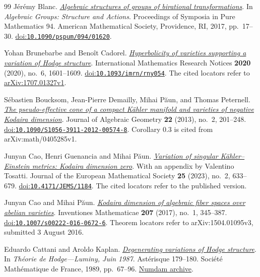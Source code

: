 \begin{thebibliography}{99}
J{\'e}r{\'e}my Blanc.
\emph{\href{https://algebra.dmi.unibas.ch/blanc/articles/structurebir.pdf}{Algebraic structures of groups of birational transformations}}.
In \emph{Algebraic Groups: Structure and Actions}.
Proceedings of Symposia in Pure Mathematics 94.
American Mathematical Society, Providence, RI, 2017, pp.~17--30.
\href{https://doi.org/10.1090/pspum/094/01620}{doi:\nolinkurl{10.1090/pspum/094/01620}}.

Yohan Brunebarbe and Beno{\^i}t Cadorel.
\emph{\href{https://arxiv.org/abs/1707.01327v1}{Hyperbolicity of varieties supporting a variation of {Hodge} structure}}.
International Mathematics Research Notices \textbf{2020} (2020), no.~6, 1601--1609.
\href{https://doi.org/10.1093/imrn/rny054}{doi:\nolinkurl{10.1093/imrn/rny054}}.
The cited locators refer to \href{https://arxiv.org/abs/1707.01327v1}{arXiv:1707.01327v1}.

S{\'e}bastien Boucksom, Jean-Pierre Demailly, Mihai P{\u a}un, and Thomas Peternell.
\emph{\href{https://arxiv.org/abs/math/0405285v1}{The pseudo-effective cone of a compact {K{\"a}hler} manifold and varieties of negative {Kodaira} dimension}}.
Journal of Algebraic Geometry \textbf{22} (2013), no.~2, 201--248.
\href{https://doi.org/10.1090/S1056-3911-2012-00574-8}{doi:\nolinkurl{10.1090/S1056-3911-2012-00574-8}}.
Corollary 0.3 is cited from arXiv:math/0405285v1.

Junyan Cao, Henri Guenancia and Mihai P{\u a}un.
\emph{\href{https://ems.press/content/serial-article-files/32808}{Variation of singular {K{\"a}hler--Einstein} metrics: {Kodaira} dimension zero}}.
With an appendix by Valentino Tosatti.
Journal of the European Mathematical Society \textbf{25} (2023), no.~2, 633--679.
\href{https://doi.org/10.4171/JEMS/1184}{doi:\nolinkurl{10.4171/JEMS/1184}}.
The cited locators refer to the published version.

Junyan Cao and Mihai P{\u a}un.
\emph{\href{https://arxiv.org/abs/1504.01095v3}{{Kodaira} dimension of algebraic fiber spaces over abelian varieties}}.
Inventiones Mathematicae \textbf{207} (2017), no.~1, 345--387.
\href{https://doi.org/10.1007/s00222-016-0672-6}{doi:\nolinkurl{10.1007/s00222-016-0672-6}}.
Theorem locators refer to arXiv:1504.01095v3, submitted 3 August 2016.

Eduardo Cattani and Aroldo Kaplan.
\emph{\href{https://numdam.org/item/AST_1989__179-180__67_0/}{Degenerating variations of {Hodge} structure}}.
In \emph{Th{\'e}orie de {Hodge}---Luminy, Juin 1987}.
Ast{\'e}risque 179--180.
Soci{\'e}t{\'e} Math{\'e}matique de France, 1989, pp.~67--96.
\href{https://numdam.org/item/AST_1989__179-180__67_0/}{Numdam archive}.


\end{thebibliography}
